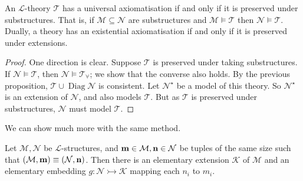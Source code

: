 \begin{corollary}[Tarski, \L{}o\'s]
    An \( \mathcal L \)-theory \( \mathcal T \) has a universal axiomatisation if and only if it is preserved under substructures.
    That is, if \( \mathcal M \subseteq \mathcal N \) are substructures and \( \mathcal M \vDash \mathcal T \) then \( \mathcal N \vDash \mathcal T \).
    Dually, a theory has an existential axiomatisation if and only if it is preserved under extensions.
\end{corollary}
\begin{proof}
    One direction is clear.
    Suppose \( \mathcal T \) is preserved under taking substructures.
    If \( \mathcal N \vDash \mathcal T \), then \( \mathcal N \vDash \mathcal T_\forall \); we show that the converse also holds.
    By the previous proposition, \( \mathcal T \cup \operatorname{Diag} \mathcal N \) is consistent.
    Let \( \mathcal N^\star \) be a model of this theory.
    So \( \mathcal N^\star \) is an extension of \( \mathcal N \), and also models \( \mathcal T \).
    But as \( \mathcal T \) is preserved under substructures, \( \mathcal N \) must model \( \mathcal T \).
\end{proof}
We can show much more with the same method.
\begin{theorem}
    Let \( \mathcal M, \mathcal N \) be \( \mathcal L \)-structures, and \( \vb m \in \mathcal M, \vb n \in \mathcal N \) be tuples of the same size such that \( (\mathcal M, \vb m) \equiv (\mathcal N, \vb n) \).
    Then there is an elementary extension \( \mathcal K \) of \( \mathcal M \) and an elementary embedding \( g : \mathcal N \rightarrowtail \mathcal K \) mapping each \( n_i \) to \( m_i \).
\end{theorem}
